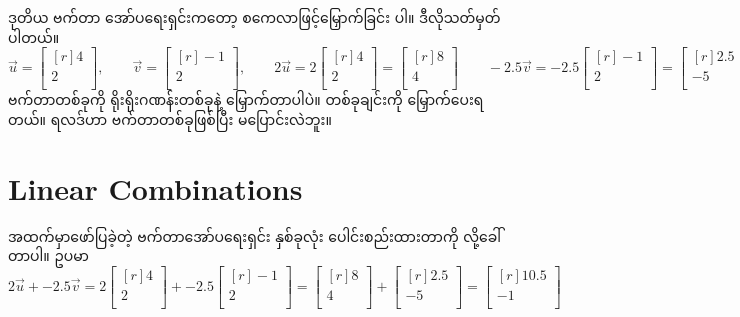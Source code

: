 ဒုတိယ ဗက်တာ အော်ပရေးရှင်းကတော့ စကေလာဖြင့်မြှောက်ခြင်း  ပါ။ ဒီလိုသတ်မှတ်ပါတယ်။
%
\[
\vec{u} = \begin{bmatrix*}[r] 4\\ 2\\ \end{bmatrix*},\qquad
\vec{v} = \begin{bmatrix*}[r] -1\\ 2\\ \end{bmatrix*},\qquad
2\vec{u}= 2\begin{bmatrix*}[r] 4\\ 2\\ \end{bmatrix*} = \begin{bmatrix*}[r] 8\\ 4\\ \end{bmatrix*}\qquad
-2.5\vec{v}= -2.5 \begin{bmatrix*}[r] -1\\ 2\\ \end{bmatrix*} = \begin{bmatrix*}[r] 2.5\\ -5\\ \end{bmatrix*}
\]
%
ဗက်တာတစ်ခုကို ရိုးရိုးဂဏန်းတစ်ခုနဲ့ မြှောက်တာပါပဲ။  တစ်ခုချင်းကို မြှောက်ပေးရတယ်။ ရလဒ်ဟာ ဗက်တာတစ်ခုဖြစ်ပြီး  မပြောင်းလဲဘူး။

\section{Linear Combinations}
အထက်မှာဖော်ပြခဲ့တဲ့ ဗက်တာအော်ပရေးရှင်း နှစ်ခုလုံး ပေါင်းစည်းထားတာကို  လို့ခေါ်တာပါ။ ဥပမာ
%
\[
2\vec{u} + -2.5\vec{v}= 2 \begin{bmatrix*}[r] 4\\ 2\\ \end{bmatrix*} 
                        + -2.5 \begin{bmatrix*}[r] -1\\ 2\\ \end{bmatrix*} 
                        = \begin{bmatrix*}[r] 8\\ 4\\ \end{bmatrix*} 
                            + \begin{bmatrix*}[r] 2.5\\ -5\\ \end{bmatrix*}
                        = \begin{bmatrix*}[r] 10.5\\ -1\\ \end{bmatrix*}
\]
%
